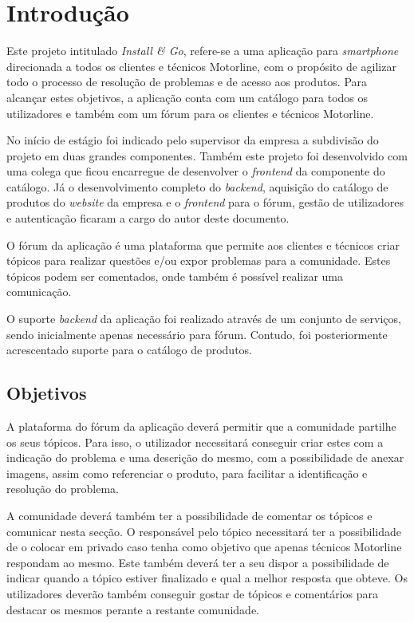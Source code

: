 
\chapter{Introdução}

Este projeto intitulado \textit{Install \& Go}, refere-se a uma aplicação para \textit{smartphone} direcionada a todos os clientes e 
técnicos Motorline, com o propósito de agilizar todo o processo de resolução de problemas e de acesso 
aos produtos. Para alcançar estes objetivos, a aplicação conta com um catálogo para todos os utilizadores 
e também com um fórum para os clientes e técnicos Motorline.

No início de estágio foi indicado pelo supervisor da empresa a subdivisão do projeto em duas grandes componentes. Também este projeto foi desenvolvido com uma colega que ficou encarregue de desenvolver o \textit{frontend} da componente do catálogo. Já o desenvolvimento completo do \textit{backend}, aquisição do catálogo de produtos do \textit{website} da empresa e o \textit{frontend} para o fórum, gestão de utilizadores e autenticação ficaram a cargo do autor deste documento.

O fórum da aplicação é uma plataforma que permite aos clientes e técnicos criar tópicos para realizar questões e/ou expor problemas para a comunidade. Estes tópicos podem ser comentados, onde também é possível realizar uma comunicação.

O suporte \textit{backend} da aplicação foi realizado através de um conjunto de serviços, sendo inicialmente apenas necessário para fórum. Contudo, foi posteriormente acrescentado suporte para o catálogo de produtos.

\newpage

\section{Objetivos}
A plataforma do fórum da aplicação deverá permitir que a comunidade partilhe os seus tópicos. Para isso, o utilizador necessitará conseguir criar estes com a indicação do problema e uma descrição do mesmo, com a possibilidade de anexar imagens, assim como referenciar o produto, para facilitar a identificação e resolução do problema.

A comunidade deverá também ter a possibilidade de comentar os tópicos e comunicar nesta secção. O responsável pelo tópico necessitará ter a possibilidade de o colocar em privado caso tenha como objetivo que apenas técnicos Motorline respondam ao mesmo. Este também deverá ter a seu dispor a possibilidade de indicar quando a tópico estiver finalizado e qual a melhor resposta que obteve. Os utilizadores deverão também conseguir gostar de tópicos e comentários para destacar os mesmos perante a restante comunidade.

